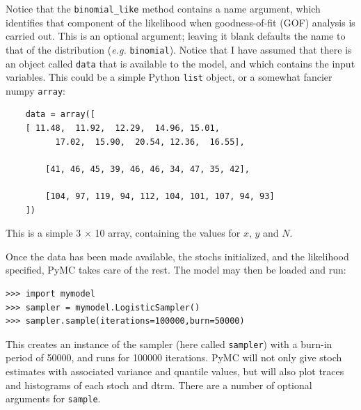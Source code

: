 \documentclass[]{book}
\begin{document}
Notice that the \verb=binomial_like= method contains a name argument, which identifies that component of the likelihood when goodness-of-fit (GOF) analysis is carried out. This is an optional argument; leaving it blank defaults the name to that of the distribution (\emph{e.g.} \verb=binomial=). Notice that I have assumed that there is an object called \verb=data= that is available to the model, and which contains the input variables. This could be a simple Python \verb=list= object, or a somewhat fancier numpy \verb=array=:

\begin{verbatim}
    data = array([
    [ 11.48,  11.92,  12.29,  14.96, 15.01,
          17.02,  15.90,  20.54, 12.36,  16.55],

        [41, 46, 45, 39, 46, 46, 34, 47, 35, 42],

        [104, 97, 119, 94, 112, 104, 101, 107, 94, 93]
    ])
\end{verbatim}
This is a simple 3 $\times$ 10 array, containing the values for $x$, $y$ and $N$.

Once the data has been made available, the stochs initialized, and the likelihood specified, PyMC takes care of the rest. The model may then be loaded and run:
\begin{verbatim}
>>> import mymodel
>>> sampler = mymodel.LogisticSampler()
>>> sampler.sample(iterations=100000,burn=50000)
\end{verbatim}
This creates an instance of the sampler (here called \verb=sampler=) with a burn-in period of 50000, and runs for 100000 iterations. PyMC will not only give stoch estimates with associated variance and quantile values, but will also plot traces and histograms of each stoch and dtrm. There are a number of optional arguments for \verb=sample=.
\end{document}
